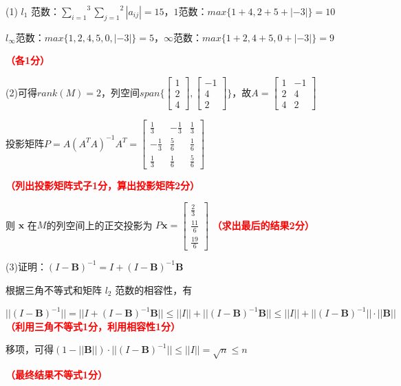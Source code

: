 \documentclass[12pt,a4paper,openany,twoside]{ctexbook}
\begin{document}
\begin{Solution}
	(1)
	$l_1$ 范数：$\stackrel{3}{\underset{i=1}{\sum}} \stackrel{2}{\underset{j=1}{\sum}}|a_{ij}|=15$，$1$范数：$max\{1+4,2+5+|-3| \}=10$

$l_{\infty}$范数：$max\{1,2,4,5,0,|-3| \}=5$，$\infty$范数：$max\{1+2,4+5,0+|-3| \}=9$
	
\hfill \textcolor{red}{\textbf{（各1分）}}
	
	(2)可得$rank(M)=2$，列空间$span\{\begin{bmatrix}
		1 \\ 2 \\ 4 
		\end{bmatrix},
		\begin{bmatrix}
		-1 \\ 4 \\ 2
		\end{bmatrix} \}$，故$A=\begin{bmatrix}  
		1 & -1 \\  
		2 & 4 \\
		4 & 2
		\end{bmatrix}$
		
		投影矩阵$P=A(A^TA)^{-1}A^T=\begin{bmatrix}  
		\frac{1}{3} & -\frac{1}{3}  & \frac{1}{3}  \\  
		-\frac{1}{3}  & \frac{5}{6}  & \frac{1}{6} \\
		\frac{1}{3}  & \frac{1}{6}  & \frac{5}{6} 
		\end{bmatrix}$

		\hfill \textcolor{red}{\textbf{（列出投影矩阵式子1分，算出投影矩阵2分）}}
		
		则 $\mathbf{x}$ 在$M$的列空间上的正交投影为 $P\mathbf{x}=\begin{bmatrix}  
		\frac{2}{3} \\  
		\frac{11}{6} \\
		\frac{19}{6}
		\end{bmatrix}$
	\hfill \textcolor{red}{\textbf{（求出最后的结果2分）}}
	
	(3)证明：$(I-\mathbf{B})^{-1}=I+(I-\mathbf{B})^{-1}\mathbf{B}$

根据三角不等式和矩阵 $l_2$ 范数的相容性，有

$||(I-\mathbf{B})^{-1}||=||I+(I-\mathbf{B})^{-1}\mathbf{B}||\leq||I||+||(I-\mathbf{B})^{-1}\mathbf{B}||\leq||I||+||(I-\mathbf{B})^{-1}||·||\mathbf{B}||$
\hfill \textcolor{red}{\textbf{（利用三角不等式1分，利用相容性1分）}}

移项，可得$(1-||\mathbf{B}||)·||(I-\mathbf{B})^{-1}|| \leq ||I||=\sqrt{n} \leq n$

\hfill \textcolor{red}{\textbf{（最终结果不等式1分）}}
\end{Solution}
\end{document}
